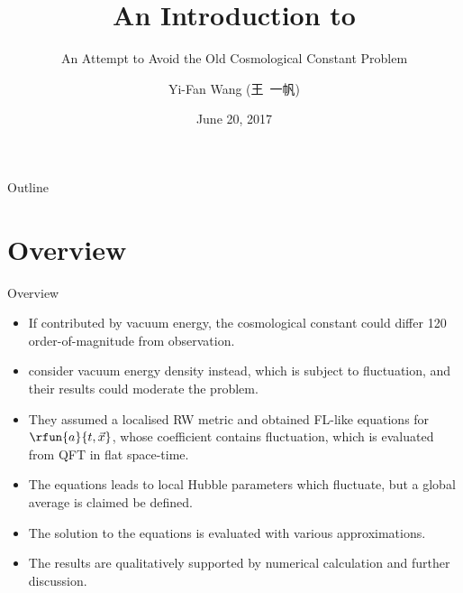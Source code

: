 \documentclass{beamer}
\title%
{An Introduction to \cite{Wang2017}}
\subtitle{An Attempt to Avoid the Old Cosmological Constant Problem}
\author[Wang] %
{Yi-Fan Wang (王\ 一帆)}
\institute[Uni zu Köln] %
{
	Institut für Theoretische Physik\\
	Universität zu Köln}
\date%
{June 20, 2017}
\begin{document}
\begin{frame}
  \titlepage
\end{frame}

\begin{frame}{Outline}
  \tableofcontents
\end{frame}





\section{Overview}

\begin{frame}{Overview}
\begin{itemize}
\item If contributed by vacuum energy, the cosmological constant could
\alert{differ \num{120} order-of-magnitude} from observation.
\item \citeauthor{Wang2017} consider vacuum energy \alert{density} instead, 
which is subject to \alert{fluctuation}, and their results could moderate the 
problem.
\item They assumed a \alert{localised RW metric} and obtained FL-like equations 
for $\rfun{a}{t,\vec{x}}$, whose coefficient contains fluctuation, which is 
evaluated from QFT in flat space-time.
\item The equations leads to local Hubble parameters which fluctuate, but a
global average is claimed be defined.
\item The solution to the equations is evaluated with various approximations.
\item The results are qualitatively supported by numerical calculation and 
further discussion.
\end{itemize}

\end{frame}
\end{document}
